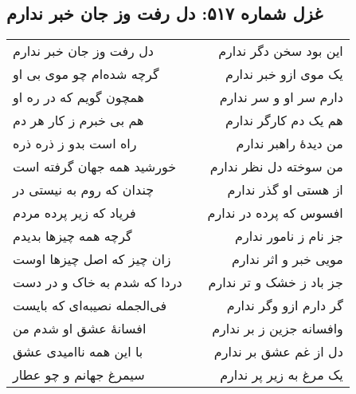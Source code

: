 \begin{center}
\section*{غزل شماره ۵۱۷: دل رفت وز جان خبر ندارم}
\label{sec:517}
\begin{longtable}{l p{0.5cm} r}
دل رفت وز جان خبر ندارم
&&
این بود سخن دگر ندارم
\\
گرچه شده‌ام چو موی بی او
&&
یک موی ازو خبر ندارم
\\
همچون گویم که در ره او
&&
دارم سر او و سر ندارم
\\
هم بی خبرم ز کار هر دم
&&
هم یک دم کارگر ندارم
\\
راه است بدو ز ذره ذره
&&
من دیدهٔ راهبر ندارم
\\
خورشید همه جهان گرفته است
&&
من سوخته دل نظر ندارم
\\
چندان که روم به نیستی در
&&
از هستی او گذر ندارم
\\
فریاد که زیر پرده مردم
&&
افسوس که پرده در ندارم
\\
گرچه همه چیزها بدیدم
&&
جز نام ز نامور ندارم
\\
زان چیز که اصل چیزها اوست
&&
مویی خبر و اثر ندارم
\\
دردا که شدم به خاک و در دست
&&
جز باد ز خشک و تر ندارم
\\
فی‌الجمله نصیبه‌ای که بایست
&&
گر دارم ازو وگر ندارم
\\
افسانهٔ عشق او شدم من
&&
وافسانه جزین ز بر ندارم
\\
با این همه ناامیدی عشق
&&
دل از غم عشق بر ندارم
\\
سیمرغ جهانم و چو عطار
&&
یک مرغ به زیر پر ندارم
\\
\end{longtable}
\end{center}
